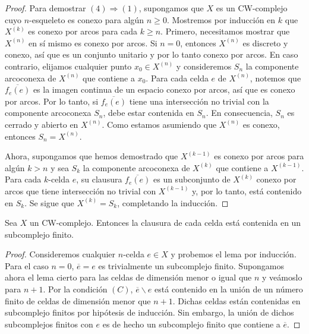 \begin{proof}
	Para demostrar $(4) \Rightarrow (1)$, supongamos que $X$ es un CW-complejo cuyo
	$n$-esqueleto es conexo para algún $n \geq 0$. Mostremos por inducción en $k$
	que $X^{(k)}$ es conexo por arcos para cada $k \geq n$. Primero, necesitamos
	mostrar que $X^{(n)}$ en sí mismo es conexo por arcos. Si $n = 0$, entonces
	$X^{(n)}$ es discreto y conexo, así que es un conjunto unitario y por lo tanto
	conexo por arcos. En caso contrario, elijamos cualquier punto $x_{0} \in X^{(n)}$
	y consideremos $S_{n}$ la componente arcoconexa de $X^{(n)}$ que contiene a $x_{0}$.
	Para cada celda $e$ de $X^{(n)}$, notemos que $\overline{f_e(e)}$ es la imagen
	continua de un espacio conexo por arcos, así que es conexo por arcos. Por lo
	tanto, si $\overline{f_e(e)}$ tiene una intersección no trivial con la
	componente arcoconexa $S_{n}$, debe estar contenida en $S_{n}$. En consecuencia,
	$S_{n}$ es cerrado y abierto en $X^{(n)}$. Como estamos asumiendo que
	$X^{(n)}$ es conexo, entonces $S_{n} = X^{(n)}$.
	
	Ahora, supongamos que hemos demostrado que $X^{(k-1)}$ es conexo por arcos
	para algún $k > n$ y sea $S_{k}$ la componente arcoconexa de $X^{(k)}$ que
	contiene a $X^{(k-1)}$. Para cada $k$-celda $e$, su clausura
	$\overline{f_e(e)}$ es un subconjunto de $X^{(k)}$ conexo por arcos que
	tiene intersección no trivial con $X^{(k-1)}$ y, por lo tanto, está contenido
	en $S_{k}$. Se sigue que $X^{(k)}= S_{k}$, completando la inducción.
\end{proof}

\begin{lema}
	\label{lem:cw-cl-finite-subcomplex} Sea $X$ un CW-complejo. Entonces la
	clausura de cada celda está contenida en un subcomplejo finito.
\end{lema}
\begin{proof}
	Consideremos cualquier $n$-celda $e \in X$ y probemos el lema por inducción.
	Para el caso $n=0$, $\overline{e}= e$ es trivialmente un subcomplejo finito.
	Supongamos ahora el lema cierto para las celdas de dimensión menor o igual que
	$n$ y veámoslo para $n+1$. Por la condición $(C)$, $\overline{e}\backslash e$
	está contenido en la unión de un número finito de celdas de dimensión menor
	que $n+1$. Dichas celdas están contenidas en subcomplejo finitos por hipótesis
	de inducción. Sin embargo, la unión de dichos subcomplejos finitos con $e$ es de
	hecho un subcomplejo finito que contiene a $\overline{e}$.
\end{proof}

